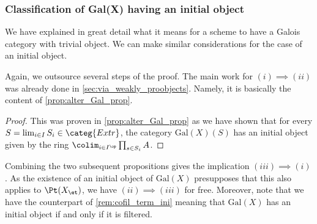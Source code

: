 \documentclass[leqno]{article}
\renewcommand{\Gal}{\mathrm{Gal}}
\newcommand{\Extr}{\categ{Extr}}
\renewcommand{\Spec}{\mathrm{Spec}}
\begin{document}
\subsubsection{Classification of Gal(X) having an initial object}
We have explained in great detail what it means for a scheme to have a Galois category with trivial object.
We can make similar considerations for the case of an initial object.
%
Again, we outsource several steps of the proof.
The main work for $(i)\implies (ii)$ was already done in \cref{sec:via_weakly_proobjects}. 
Namely, it is basically the content of \cref{prop:alter_Gal_prop}.
%
\begin{proof}
This was proven in \cref{prop:alter_Gal_prop} as we have shown that for every $S=\lim_{i \in I} S_i\in \Extr$, the category $\Gal(X)(S)$ has an initial object given by the ring 
$\colim_{i \in I^{\op}}\prod_{s\in S_i} A$.
\end{proof}
%
Combining the two subsequent propositions gives the implication $(iii)\implies (i)$.
As the existence of an initial object of $\Gal(X)$ presupposes that this also applies to $\Pt(X_{\et})$, we have $(ii) \implies (iii)$ for free.
Moreover, note that we have the counterpart of \cref{rem:cofil_term_ini} meaning that $\Gal(X)$ has an initial object if and only if it is filtered.
%
\end{document}
